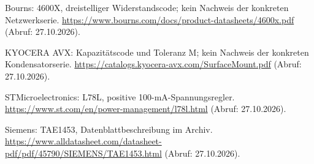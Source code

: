 \begin{description}[style=nextline,leftmargin=1.2cm]
\item[Q14] Bourns: 4600X, dreistelliger Widerstandscode; kein Nachweis der konkreten Netzwerkserie. \url{https://www.bourns.com/docs/product-datasheets/4600x.pdf} (Abruf: 27.10.2026).
\item[Q15] KYOCERA AVX: Kapazitätscode und Toleranz M; kein Nachweis der konkreten Kondensatorserie. \url{https://catalogs.kyocera-avx.com/SurfaceMount.pdf} (Abruf: 27.10.2026).
\item[Q16] STMicroelectronics: L78L, positive 100-mA-Spannungsregler. \url{https://www.st.com/en/power-management/l78l.html} (Abruf: 27.10.2026).
\item[Q17] Siemens: TAE1453, Datenblattbeschreibung im Archiv. \url{https://www.alldatasheet.com/datasheet-pdf/pdf/45790/SIEMENS/TAE1453.html} (Abruf: 27.10.2026).
\end{description}
